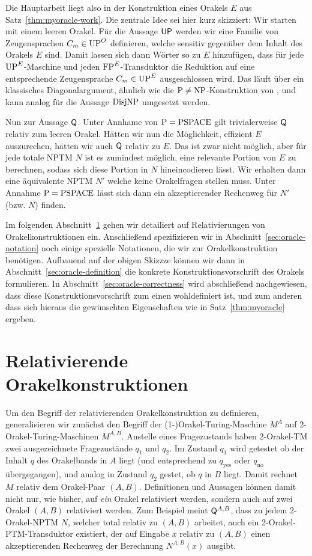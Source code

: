 Die Hauptarbeit liegt also in der Konstruktion eines Orakels $E$ aus Satz~\ref{thm:myoracle-work}.
Die zentrale Idee sei hier kurz skizziert:
Wir starten mit einem leeren Orakel.
Für die Aussage $\mathsf{UP}$ werden wir eine Familie von Zeugensprachen $C_m\in\mathrm{UP}^O$ definieren, welche sensitiv gegenüber dem Inhalt des Orakels $E$ sind.
Damit lassen sich dann Wörter so zu $E$ hinzufügen, dass für jede $\mathrm{UP}^E$-Maschine und jeden $\mathrm{FP}^E$-Transduktor die Reduktion auf eine entsprechende Zeugensprache $C_m\in\mathrm{UP}^E$ ausgeschlossen wird.
Das läuft über ein klassisches Diagonalargument, ähnlich wie die $\mathrm{P}\neq\mathrm{NP}$-Konstruktion von \textcite{baker_relativizations_1975}, und kann analog für die Aussage $\mathrm{DisjNP}$ umgesetzt werden.

Nun zur Aussage $\mathsf{Q}$. Unter Annhame von $\mathrm{P}=\mathrm{PSPACE}$ gilt trivialerweise $\mathsf{Q}$ relativ zum leeren Orakel. 
Hätten wir nun die Möglichkeit, effizient $E$ auszurechen, hätten wir auch $\mathsf{Q}$ relativ zu $E$.
Das ist zwar nicht möglich, aber für jede totale NPTM $N$ ist es zumindest möglich, eine relevante Portion von $E$ zu berechnen, sodass sich diese Portion in $N$ hineincodieren lässt. Wir erhalten dann eine äquivalente NPTM $N'$ welche keine Orakelfragen stellen muss. Unter Annahme $\mathrm{P}=\mathrm{PSPACE}$ lässt sich dann ein akzeptierender Rechenweg für $N'$ (bzw. $N$) finden.


Im folgenden Abschnitt~\ref{sec:oracle-relativization} gehen wir detailiert auf Relativierungen von Orakelkonstruktionen ein.
Anschließend spezifizieren wir in Abschnitt~\ref{sec:oracle-notation} noch einige spezielle Notationen, die wir zur Orakelkonstruktion benötigen.
Aufbauend auf der obigen Skizzze können wir dann in Abschnitt~\ref{sec:oracle-definition} die konkrete Konstruktionsvorschrift des Orakels formulieren.
In Abschnitt~\ref{sec:oracle-correctness} wird abschließend nachgewiesen, dass diese Konstruktionsvorschrift zum einen wohldefiniert ist, und zum anderen dass sich hieraus die gewünschten Eigenschaften wie in Satz~\ref{thm:myoracle} ergeben.


\section{Relativierende Orakelkonstruktionen}\label{sec:oracle-relativization}

Um den Begriff der relativierenden Orakelkonstruktion zu definieren, generalisieren wir zunächst den Begriff der (1-)Orakel-Turing-Maschine $M^A$ auf 2-Orakel-Turing-Maschinen $M^{A,B}$. Anstelle eines Fragezustands haben 2-Orakel-TM zwei ausgezeichnete Fragezustände $q_1$ und $q_2$. 
Im Zustand $q_1$ wird getestet ob der Inhalt $q$ des Orakelbands in $A$ liegt (und entsprechend zu $q_{\text{yes}}$ oder $q_{\text{no}}$ übergegangen), und analog in Zustand $q_2$ gestet, ob $q$ in $B$ liegt.
Damit rechnet $M$ relativ dem Orakel-Paar $(A,B)$. 
Definitionen und Aussagen können damit nicht nur, wie bisher, auf \emph{ein} Orakel relativiert werden, sondern auch auf zwei Orakel $(A,B)$ relativiert werden.
Zum Beispiel meint $\mathsf{Q}^{A,B}$, dass zu jedem 2-Orakel-NPTM $N$, welcher total relativ zu $(A,B)$ arbeitet, auch ein 2-Orakel-PTM-Transduktor existiert, der auf Eingabe $x$ relativ zu $(A,B)$ einen akzeptierenden Rechenweg der Berechnung $N^{A,B}(x)$ ausgibt.

